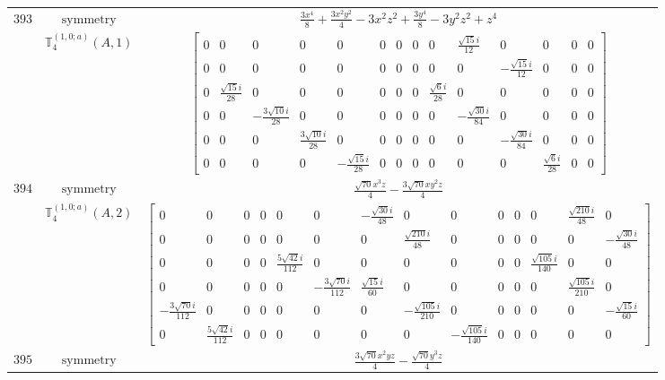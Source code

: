 \documentclass[fleqn,8pt,landscape]{jsarticle}
\begin{document}
\begin{longtable}{ccc}
$ 393 $ & $ \text{symmetry} $ & $ \frac{3 x^{4}}{8} + \frac{3 x^{2} y^{2}}{4} - 3 x^{2} z^{2} + \frac{3 y^{4}}{8} - 3 y^{2} z^{2} + z^{4} $ \\
$  $ & $ \mathbb{T}_{4}^{(1,0;a)}(A,1) $ & $ \begin{bmatrix} 0 & 0 & 0 & 0 & 0 & 0 & 0 & 0 & 0 & \frac{\sqrt{15} i}{12} & 0 & 0 & 0 & 0 \\ 0 & 0 & 0 & 0 & 0 & 0 & 0 & 0 & 0 & 0 & - \frac{\sqrt{15} i}{12} & 0 & 0 & 0 \\ 0 & \frac{\sqrt{15} i}{28} & 0 & 0 & 0 & 0 & 0 & 0 & \frac{\sqrt{6} i}{28} & 0 & 0 & 0 & 0 & 0 \\ 0 & 0 & - \frac{3 \sqrt{10} i}{28} & 0 & 0 & 0 & 0 & 0 & 0 & - \frac{\sqrt{30} i}{84} & 0 & 0 & 0 & 0 \\ 0 & 0 & 0 & \frac{3 \sqrt{10} i}{28} & 0 & 0 & 0 & 0 & 0 & 0 & - \frac{\sqrt{30} i}{84} & 0 & 0 & 0 \\ 0 & 0 & 0 & 0 & - \frac{\sqrt{15} i}{28} & 0 & 0 & 0 & 0 & 0 & 0 & \frac{\sqrt{6} i}{28} & 0 & 0 \end{bmatrix} $ \\ \hline
$ 394 $ & $ \text{symmetry} $ & $ \frac{\sqrt{70} x^{3} z}{4} - \frac{3 \sqrt{70} x y^{2} z}{4} $ \\
$  $ & $ \mathbb{T}_{4}^{(1,0;a)}(A,2) $ & $ \begin{bmatrix} 0 & 0 & 0 & 0 & 0 & 0 & - \frac{\sqrt{30} i}{48} & 0 & 0 & 0 & 0 & 0 & \frac{\sqrt{210} i}{48} & 0 \\ 0 & 0 & 0 & 0 & 0 & 0 & 0 & \frac{\sqrt{210} i}{48} & 0 & 0 & 0 & 0 & 0 & - \frac{\sqrt{30} i}{48} \\ 0 & 0 & 0 & 0 & \frac{5 \sqrt{42} i}{112} & 0 & 0 & 0 & 0 & 0 & 0 & \frac{\sqrt{105} i}{140} & 0 & 0 \\ 0 & 0 & 0 & 0 & 0 & - \frac{3 \sqrt{70} i}{112} & \frac{\sqrt{15} i}{60} & 0 & 0 & 0 & 0 & 0 & \frac{\sqrt{105} i}{210} & 0 \\ - \frac{3 \sqrt{70} i}{112} & 0 & 0 & 0 & 0 & 0 & 0 & - \frac{\sqrt{105} i}{210} & 0 & 0 & 0 & 0 & 0 & - \frac{\sqrt{15} i}{60} \\ 0 & \frac{5 \sqrt{42} i}{112} & 0 & 0 & 0 & 0 & 0 & 0 & - \frac{\sqrt{105} i}{140} & 0 & 0 & 0 & 0 & 0 \end{bmatrix} $ \\ \hline
$ 395 $ & $ \text{symmetry} $ & $ \frac{3 \sqrt{70} x^{2} y z}{4} - \frac{\sqrt{70} y^{3} z}{4} $ \\

\end{longtable}
\end{document}
